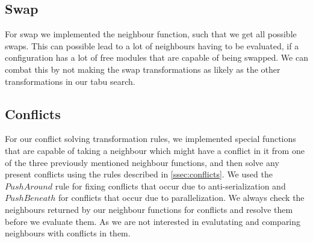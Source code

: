 \subsection{Swap}
For swap we implemented the neighbour function, such that we get all possible swaps. This can possible lead to a lot of neighbours having to be evaluated, if a configuration has a lot of free modules that are capable of being swapped. We can combat this by not making the swap transformations as likely as the other transformations in our tabu search.

\subsection{Conflicts}
For our conflict solving transformation rules, we implemented special functions that are capable of taking a neighbour which might have a conflict in it from one of the three previously mentioned neighbour functions, and then solve any present conflicts using the rules described in \cref{ssec:conflicts}. We used the $Push Around$ rule for fixing conflicts that occur due to anti-serialization and $Push Beneath$ for conflicts that occur due to parallelization.
 We always check the neighbours returned by our neighbour functions for conflicts and resolve them before we evaluate them. As we are not interested in evalutating and comparing neighbours with conflicts in them.
